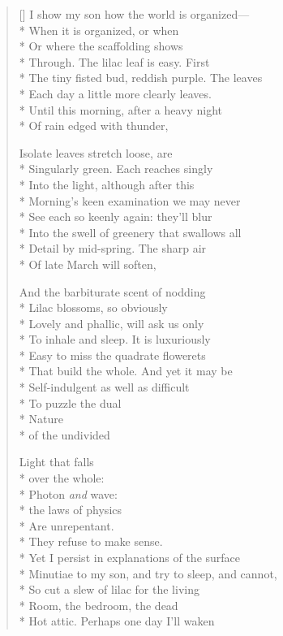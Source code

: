 \label{ch:physics_lesson}
\settowidth{\versewidth}{Sense or logic, at least of any kind that might apply}
\begin{verse}[\versewidth]
I show my son how the world is organized---\\*
When it is organized, or when\\*
Or where the scaffolding shows\\*
Through. The lilac leaf is easy.  First\\*
The tiny fisted bud, reddish purple.  The leaves\\*
Each day a little more clearly leaves.\\*
Until this morning, after a heavy night\\*
Of rain edged with thunder,

Isolate leaves stretch loose, are\\*
Singularly green. Each reaches singly\\*
Into the light, although after this\\*
Morning's keen examination we may never\\*
See each so keenly again: they'll blur\\*
Into the swell of greenery that swallows all\\*
Detail by mid-spring.  The sharp air\\*
Of late March will soften,

And the barbiturate scent of nodding\\*
Lilac blossoms, so obviously \\*
Lovely and phallic, will ask us only\\*
To inhale and sleep.  It is luxuriously\\*
Easy to miss the quadrate flowerets\\*
That build the whole.  And yet it may be\\*
Self-indulgent as well as difficult\\*
To puzzle the dual\\*
 \qquad  \qquad  \qquad Nature\\*
 \qquad  \qquad  \qquad  \qquad of the undivided

Light that falls\\*
 \qquad  \qquad over the whole:\\*
Photon \textit{and} wave:\\*
 \qquad  \qquad     the laws of physics\\*
Are unrepentant.\\*
 \qquad  \qquad     They refuse to make sense.\\*
Yet I persist in explanations of the surface\\*
Minutiae to my son, and try to sleep, and cannot,\\*
So cut a slew of lilac for the living\\*
Room, the bedroom, the dead\\*
Hot attic.  Perhaps one day I'll waken


\end{verse}
